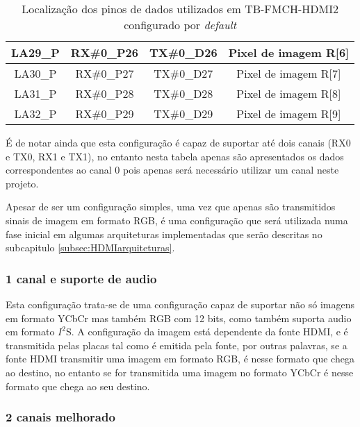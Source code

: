 \begin{table}[h!]
\begin{tabular}{|c|c|c|c|}
		LA29\_P      & RX\#0\_P26                           & TX\#0\_D26                         & Pixel de imagem R{[}6{]} \\ \hline
		LA30\_P      & RX\#0\_P27                           & TX\#0\_D27                         & Pixel de imagem R{[}7{]} \\ \hline
		LA31\_P      & RX\#0\_P28                           & TX\#0\_D28                         & Pixel de imagem R{[}8{]} \\ \hline
		LA32\_P      & RX\#0\_P29                           & TX\#0\_D29                         & Pixel de imagem R{[}9{]} \\ \hline
	\end{tabular}
	\caption{Localização dos pinos de dados utilizados em TB-FMCH-HDMI2 configurado por \textit{default}}
	\label{table:HDMIdataDefaultdetail}
\end{table}

É de notar ainda que esta configuração é capaz de suportar até dois canais (RX0 e TX0, RX1 e TX1), no entanto nesta tabela apenas são apresentados os dados correspondentes ao canal 0 pois apenas será necessário utilizar um canal neste projeto. 

Apesar de ser um configuração simples, uma vez que apenas são transmitidos sinais de imagem em formato RGB, é uma configuração que será utilizada numa fase inicial em algumas arquiteturas implementadas que serão descritas no subcapitulo \ref{subsec:HDMIarquiteturas}.

\subsubsection{1 canal e suporte de audio} \label {subsubsec:HDMIconfig+audio}

Esta configuração trata-se de uma configuração capaz de suportar não só imagens em formato YCbCr mas também RGB com 12 bits, como também suporta audio em formato $I^{2}$S. A configuração da imagem está dependente da fonte HDMI, e é transmitida pelas placas tal como é emitida pela fonte, por outras palavras, se a fonte HDMI transmitir uma imagem em formato RGB, é nesse formato que chega ao destino, no entanto se for transmitida uma imagem no formato YCbCr é nesse formato que chega ao seu destino.



\subsubsection{2 canais melhorado} \label{subsubsec:HDMIconfigMelhorado}

